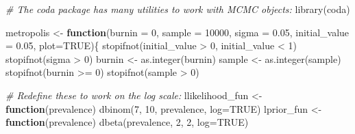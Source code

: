 \documentclass[
  12pt,
]{article}
\newenvironment{Shaded}{\begin{snugshade}}{\end{snugshade}}
\newcommand{\AttributeTok}[1]{\textcolor[rgb]{0.77,0.63,0.00}{#1}}
\newcommand{\CommentTok}[1]{\textcolor[rgb]{0.56,0.35,0.01}{\textit{#1}}}
\newcommand{\ConstantTok}[1]{\textcolor[rgb]{0.00,0.00,0.00}{#1}}
\newcommand{\ControlFlowTok}[1]{\textcolor[rgb]{0.13,0.29,0.53}{\textbf{#1}}}
\newcommand{\DecValTok}[1]{\textcolor[rgb]{0.00,0.00,0.81}{#1}}
\newcommand{\FloatTok}[1]{\textcolor[rgb]{0.00,0.00,0.81}{#1}}
\newcommand{\FunctionTok}[1]{\textcolor[rgb]{0.00,0.00,0.00}{#1}}
\newcommand{\NormalTok}[1]{#1}
\newcommand{\OtherTok}[1]{\textcolor[rgb]{0.56,0.35,0.01}{#1}}
\newcommand{\SpecialCharTok}[1]{\textcolor[rgb]{0.00,0.00,0.00}{#1}}
\newcommand{\StringTok}[1]{\textcolor[rgb]{0.31,0.60,0.02}{#1}}
\begin{document}
\begin{Shaded}
\begin{Highlighting}[]
\CommentTok{\# The coda package has many utilities to work with MCMC objects:}
\FunctionTok{library}\NormalTok{(}\StringTok{\textquotesingle{}coda\textquotesingle{}}\NormalTok{)}

\NormalTok{metropolis }\OtherTok{\textless{}{-}} \ControlFlowTok{function}\NormalTok{(}\AttributeTok{burnin =} \DecValTok{0}\NormalTok{, }\AttributeTok{sample =} \DecValTok{10000}\NormalTok{, }\AttributeTok{sigma =} \FloatTok{0.05}\NormalTok{, }
              \AttributeTok{initial\_value =} \FloatTok{0.05}\NormalTok{, }\AttributeTok{plot=}\ConstantTok{TRUE}\NormalTok{)\{}
  \FunctionTok{stopifnot}\NormalTok{(initial\_value }\SpecialCharTok{\textgreater{}} \DecValTok{0}\NormalTok{, initial\_value }\SpecialCharTok{\textless{}} \DecValTok{1}\NormalTok{)}
  \FunctionTok{stopifnot}\NormalTok{(sigma }\SpecialCharTok{\textgreater{}} \DecValTok{0}\NormalTok{)}
\NormalTok{  burnin }\OtherTok{\textless{}{-}} \FunctionTok{as.integer}\NormalTok{(burnin)}
\NormalTok{  sample }\OtherTok{\textless{}{-}} \FunctionTok{as.integer}\NormalTok{(sample)}
  \FunctionTok{stopifnot}\NormalTok{(burnin }\SpecialCharTok{\textgreater{}=} \DecValTok{0}\NormalTok{)}
  \FunctionTok{stopifnot}\NormalTok{(sample }\SpecialCharTok{\textgreater{}} \DecValTok{0}\NormalTok{)}

  \CommentTok{\# Redefine these to work on the log scale:}
\NormalTok{  llikelihood\_fun }\OtherTok{\textless{}{-}} \ControlFlowTok{function}\NormalTok{(prevalence)}
    \FunctionTok{dbinom}\NormalTok{(}\DecValTok{7}\NormalTok{, }\DecValTok{10}\NormalTok{, prevalence, }\AttributeTok{log=}\ConstantTok{TRUE}\NormalTok{)}
\NormalTok{  lprior\_fun }\OtherTok{\textless{}{-}} \ControlFlowTok{function}\NormalTok{(prevalence) }
    \FunctionTok{dbeta}\NormalTok{(prevalence, }\DecValTok{2}\NormalTok{, }\DecValTok{2}\NormalTok{, }\AttributeTok{log=}\ConstantTok{TRUE}\NormalTok{)}


\end{Highlighting}
\end{Shaded}
\end{document}
